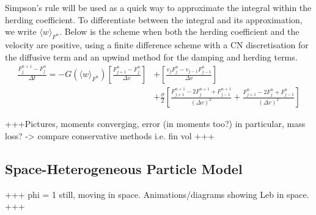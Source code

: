     Simpson's rule will be used as a quick way to approximate the integral within the herding coefficient. To differentiate between the integral and its approximation, we write \(\langle w\rangle_{F^n}\). Below is the scheme when both the herding coefficient and the velocity are positive, using a finite difference scheme with a CN discretisation for the diffusive term and an upwind method for the damping and herding terms.
    \begin{equation*}
    \begin{split}
    \frac{F_j^{n+1} - F_j^n}{\Delta t} = 	-G(\langle w\rangle_{F^n})\left[ \frac{F^n_{j+1} - F^n_{j}}{\Delta v}\right] &+\left[ \frac{v_{j}F^n_{j} - v_{j-1}F^n_{j-1}}{\Delta v}\right]\\ &+ \frac{\sigma}{2}\left[ \frac{F^{n+1}_{j+1} - 2F^{n+1}_j + F^{n+1}_{j-1}}{(\Delta v)^2} + \frac{F^{n}_{j+1} - 2F^{n}_j + F^{n}_{j-1}}{(\Delta v)^2}\right] 	 
    \end{split}
    \end{equation*}
    
    +++Pictures, moments converging, error (in moments too?) in particular, mass loss? -> compare conservative methods i.e. fin vol +++
\subsection{Space-Heterogeneous Particle Model}\label{sec:hetkin}
    +++ phi = 1 still, moving in space. Animations/diagrams showing Leb in space. +++
    
